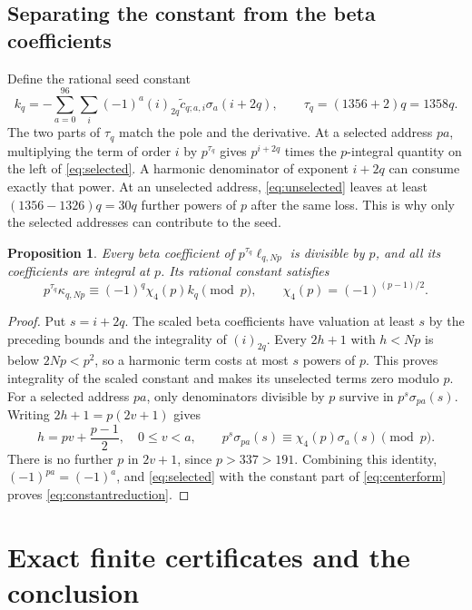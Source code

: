 \documentclass[11pt]{article}
\newtheorem{proposition}[theorem]{Proposition}
\theoremstyle{remark}
\numberwithin{equation}{section}
\begin{document}
\subsection{Separating the constant from the beta coefficients}

Define the rational seed constant
\begin{equation}\label{eq:kq}
 k_q=-\sum_{a=0}^{96}\sum_i(-1)^a(i)_{2q}
                    \widetilde c_{q;a,i}\sigma_a(i+2q),
 \qquad \tau_q=(1356+2)q=1358q.
\end{equation}
The two parts of $\tau_q$ match the pole and the derivative. At a
selected address $pa$, multiplying the term of order $i$ by $p^{\tau_q}$
gives $p^{i+2q}$ times the $p$-integral quantity on the left of
\eqref{eq:selected}. A harmonic denominator of exponent $i+2q$ can
consume exactly that power. At an unselected address,
\eqref{eq:unselected} leaves at least $(1356-1326)q=30q$ further
powers of $p$ after the same loss. This is why only the selected
addresses can contribute to the seed.

\begin{proposition}\label{prop:unit}
Every beta coefficient of $p^{\tau_q}\ell_{q,Np}$ is divisible
by $p$, and all its coefficients are integral at $p$. Its rational
constant satisfies
\begin{equation}\label{eq:constantreduction}
 p^{\tau_q}\kappa_{q,Np}
             \equiv(-1)^q\chi_4(p)k_q\pmod p,
 \qquad \chi_4(p)=(-1)^{(p-1)/2}.
\end{equation}
\end{proposition}
\begin{proof}
Put $s=i+2q$. The scaled beta coefficients have valuation at least
$s$ by the preceding bounds and the integrality of $(i)_{2q}$.
Every $2h+1$ with $h<Np$ is below $2Np<p^2$, so a harmonic term
costs at most $s$ powers of $p$. This proves integrality of the
scaled constant and makes its unselected terms zero modulo $p$.
For a selected address $pa$, only denominators divisible by $p$
survive in $p^s\sigma_{pa}(s)$. Writing
$2h+1=p(2v+1)$ gives
\[
 h=pv+\frac{p-1}{2},\quad 0\le v<a,\qquad
 p^s\sigma_{pa}(s)\equiv\chi_4(p)\sigma_a(s)\pmod p.
\]
There is no further $p$ in $2v+1$, since $p>337>191$.
Combining this identity, $(-1)^{pa}=(-1)^a$, and
\eqref{eq:selected} with the constant part of
\eqref{eq:centerform} proves \eqref{eq:constantreduction}.
\end{proof}

\section{Exact finite certificates and the conclusion}
\label{sec:certificate}
\end{document}
